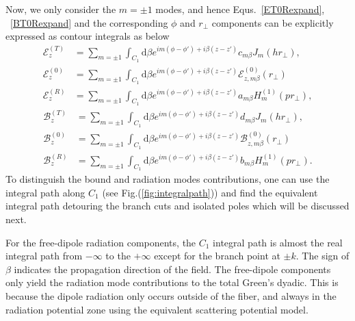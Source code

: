 Now, we only consider the $ m=\pm 1 $ modes, and hence Equs.~\ref{ET0Rexpand}, ~\ref{BT0Rexpand} and the corresponding $ \phi $ and $ r\!_\perp $ components can be explicitly expressed as contour integrals as below
\begin{subequations}\label{ET0RC1}
\begin{align}
\mathcal{E}^{(T)}_z &= \sum_{m=\pm 1} \int_{C_1} \mathrm{d}\beta e^{im(\phi-\phi') + i\beta (z-z')} c_{m\beta} J_m (hr\!_\perp),\\
\mathcal{E}^{(0)}_{z} &= \sum_{m=\pm 1} \int_{C_1} \mathrm{d}\beta e^{im(\phi-\phi') + i\beta (z-z')} \mathcal{E}^{(0)}_{z,m\beta}(r\!_\perp)\\
\mathcal{E}^{(R)}_z &= \sum_{m=\pm 1} \int_{C_1} \mathrm{d}\beta e^{im(\phi-\phi') + i\beta (z-z')} a_{m\beta} H_m^{(1)} (pr\!_\perp),
\end{align}
\end{subequations}
\begin{subequations}\label{BT0RC1}
\begin{align}
\mathcal{B}^{(T)}_z &= \sum_{m=\pm 1} \int_{C_1} \mathrm{d}\beta e^{im(\phi-\phi') + i\beta (z-z')} d_{m\beta} J_m (hr\!_\perp),\\
\mathcal{B}^{(0)}_{z} &= \sum_{m=\pm 1} \int_{C_1} \mathrm{d}\beta e^{im(\phi-\phi') + i\beta (z-z')} \mathcal{B}^{(0)}_{z,m\beta}(r\!_\perp)\\
\mathcal{B}^{(R)}_z &= \sum_{m=\pm 1} \int_{C_1} \mathrm{d}\beta e^{im(\phi-\phi') + i\beta (z-z')} b_{m\beta} H_m^{(1)} (pr\!_\perp).
\end{align}
\end{subequations}
To distinguish the bound and radiation modes contributions, one can use the integral path along $ C_1 $ (see Fig.(\ref{fig:integralpath})) and find the equivalent integral path detouring the branch cuts and isolated poles which will be discussed next. 

For the free-dipole radiation components, the $ C_1 $ integral path is almost the real integral path from $ -\infty $ to the $ +\infty $ except for the branch point at $ \pm k $. The sign of $ \beta $ indicates the propagation direction of the field. The free-dipole components only yield the radiation mode contributions to the total Green's dyadic. This is because the dipole radiation only occurs outside of the fiber, and always in the radiation potential zone using the equivalent scattering potential model. 

